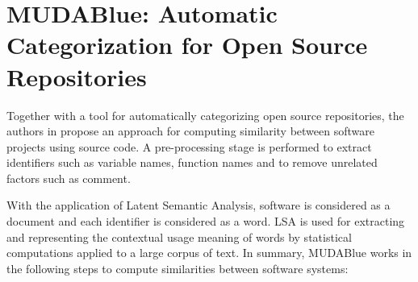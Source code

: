 


\section{MUDABlue: Automatic Categorization for Open Source Repositories}\label{sec:mudablue}


Together with a tool for automatically categorizing open source repositories, the authors in \cite{10.1109/APSEC.2004.69} propose an approach for computing similarity between software projects using source code. A pre-processing stage is performed to extract identifiers such as variable names, function names and to remove unrelated factors such as comment.

With the application of Latent Semantic Analysis, software is considered as a document and each identifier is considered as a word. LSA is used for extracting and representing the contextual usage meaning of words by statistical computations applied to a large corpus of text. In summary, MUDABlue works in the following steps to compute similarities between software systems:

